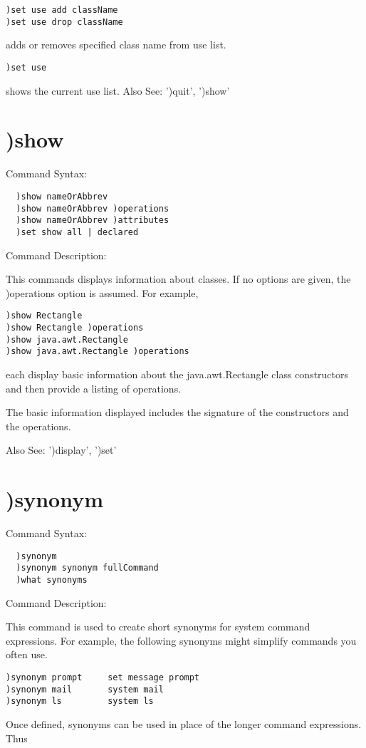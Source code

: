 \begin{verbatim}
)set use add className
)set use drop className
\end{verbatim}
adds or removes specified class name from use list.

\begin{verbatim}
)set use
\end{verbatim}
shows the current use list.
Also See: ')quit', ')show'

\section{ )show}

Command Syntax:
\begin{verbatim}
  )show nameOrAbbrev
  )show nameOrAbbrev )operations
  )show nameOrAbbrev )attributes
  )set show all | declared
\end{verbatim}
Command Description:

This commands displays information about classes. If no options are given, the )operations option is assumed. For example,
\begin{verbatim}
)show Rectangle
)show Rectangle )operations
)show java.awt.Rectangle
)show java.awt.Rectangle )operations
\end{verbatim}
each display basic information about the java.awt.Rectangle class constructors and then provide a listing of operations.

The basic information displayed includes the signature of the constructors and the operations.

Also See: ')display', ')set'

\section{)synonym}

Command Syntax:
\begin{verbatim}
  )synonym
  )synonym synonym fullCommand
  )what synonyms
\end{verbatim}
Command Description:

This command is used to create short synonyms for system command expressions. For example, the following synonyms might simplify commands you often use.

\begin{verbatim}
)synonym prompt     set message prompt
)synonym mail       system mail
)synonym ls         system ls
\end{verbatim}
Once defined, synonyms can be used in place of the longer command expressions. Thus

